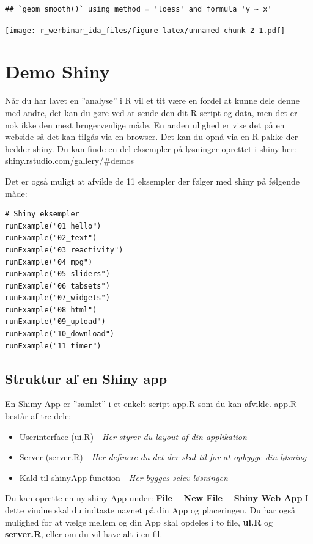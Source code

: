 \documentclass[
]{book}
\providecommand{\tightlist}{%
  \setlength{\itemsep}{0pt}\setlength{\parskip}{0pt}}
\begin{document}
\begin{verbatim}
## `geom_smooth()` using method = 'loess' and formula 'y ~ x'
\end{verbatim}

\texttt{[image: r\_werbinar\_ida\_files/figure-latex/unnamed-chunk-2-1.pdf]}

\hypertarget{shiny}{%
\chapter{Demo Shiny}\label{shiny}}

Når du har lavet en ''analyse'' i R vil et tit være en fordel at kunne dele denne med andre, det kan du gøre ved at sende den dit R script og data, men det er nok ikke den mest brugervenlige måde.
En anden ulighed er vise det på en webside så det kan tilgås via en browser. Det kan du opnå via en R pakke der hedder shiny.
Du kan finde en del eksempler på løsninger oprettet i shiny her: shiny.rstudio.com/gallery/\#demos

Det er også muligt at afvikle de 11 eksempler der følger med shiny på følgende måde:

\begin{verbatim}
# Shiny eksempler
runExample("01_hello")
runExample("02_text")
runExample("03_reactivity")
runExample("04_mpg")
runExample("05_sliders")
runExample("06_tabsets")
runExample("07_widgets")
runExample("08_html")
runExample("09_upload")
runExample("10_download")
runExample("11_timer")
\end{verbatim}

\hypertarget{struktur-af-en-shiny-app}{%
\section{Struktur af en Shiny app}\label{struktur-af-en-shiny-app}}

En Shimy App er ''samlet'' i et enkelt script app.R som du kan afvikle.
app.R består af tre dele:

\begin{itemize}
\tightlist
\item
  Userinterface (ui.R) - \emph{Her styrer du layout af din applikation}
\item
  Server (server.R) - \emph{Her definere du det der skal til for at opbygge din løsning}
\item
  Kald til shinyApp function - \emph{Her bygges selev løsningen}
\end{itemize}

Du kan oprette en ny shiny App under:
\textbf{File -- New File -- Shiny Web App}
I dette vindue skal du indtaste navnet på din App og placeringen. Du har også mulighed for at vælge mellem og din App skal opdeles i to file, \textbf{ui.R} og \textbf{server.R}, eller om du vil have alt i en fil.
\end{document}
